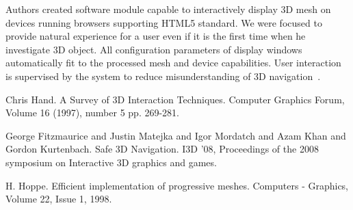 Authors created software module capable to interactively display 3D mesh on devices running browsers supporting HTML5 standard. We were focused to provide natural experience for a user even if it is the first time when he investigate 3D object. All configuration parameters of display windows automatically fit to the processed mesh and device capabilities. User interaction is supervised by the system to reduce misunderstanding of 3D navigation~\cite{fitz08}.


\begin{thebibliography}{10}

{\sc Chris Hand}. {A Survey of 3D Interaction Techniques}. Computer Graphics Forum, Volume 16 (1997), number 5 pp. 269-281.



{\sc George Fitzmaurice and Justin Matejka and Igor Mordatch and Azam Khan and Gordon Kurtenbach}. {Safe 3D Navigation}. I3D '08, Proceedings of the 2008 symposium on Interactive 3D graphics and games.



{\sc H. Hoppe}. {Efficient implementation of progressive meshes}. Computers - Graphics, Volume 22, Issue 1, 1998.

\end{thebibliography}
